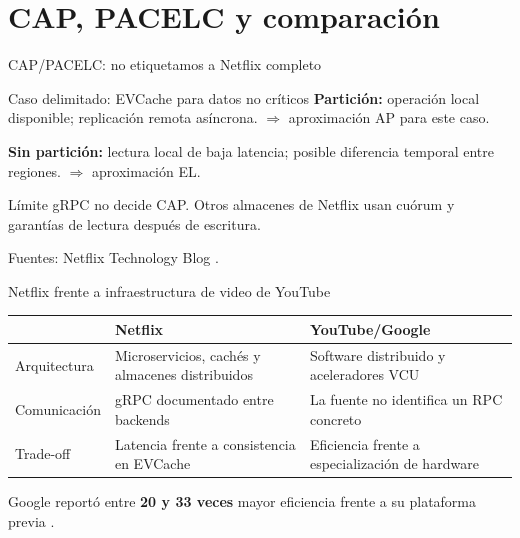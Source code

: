 \section{CAP, PACELC y comparación}

\begin{frame}{CAP/PACELC: no etiquetamos a Netflix completo}
\begin{block}{Caso delimitado: EVCache para datos no críticos}
\textbf{Partición:} operación local disponible; replicación remota asíncrona.
\quad $\Rightarrow$ aproximación AP para este caso.

\textbf{Sin partición:} lectura local de baja latencia; posible diferencia
temporal entre regiones. \quad $\Rightarrow$ aproximación EL.
\end{block}
\begin{alertblock}{Límite}
gRPC no decide CAP. Otros almacenes de Netflix usan cuórum y garantías de
lectura después de escritura.
\end{alertblock}
{\footnotesize Fuentes: Netflix Technology Blog \cite{netflix-evcache,netflix-media-db}.}
\end{frame}

\begin{frame}{Netflix frente a infraestructura de video de YouTube}
\small
\begin{tabularx}{\linewidth}{@{}p{2.1cm}XX@{}}
\toprule
 & \textbf{Netflix} & \textbf{YouTube/Google} \\
\midrule
Arquitectura & Microservicios, cachés y almacenes distribuidos & Software
distribuido y aceleradores VCU \\
Comunicación & gRPC documentado entre backends & La fuente no identifica un RPC
concreto \\
Trade-off & Latencia frente a consistencia en EVCache & Eficiencia frente a
especialización de hardware \\
\bottomrule
\end{tabularx}
\medskip
Google reportó entre \textbf{20 y 33 veces} mayor eficiencia frente a su
plataforma previa \cite{google-vcu}.
\end{frame}
